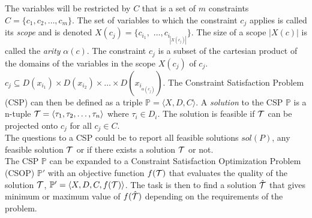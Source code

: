 The variables will be restricted by $C$ that is a set of $m$ constraints $C= \{ 
c_1,c_2, \dots , c_m \} $. The set of variables to which the constraint $c_j$   applies is 
called its \emph{scope} and 
is denoted $X(c_j) = \{c_{i_1} ,$ $ \dots , c_{i_{|X(c_j)|}}\}$. The size of a scope $|X(c)|$ is called the 
\emph{arity} $\alpha(c)$. The constraint $c_j$ is a subset of the cartesian product of the domains of the variables in 
the scope $X(c_j)$ of $c_j$. $c_j \subseteq D(x_{i_1}) \times D(x_{i_2}) \times \dots \times D(x_{i_{\alpha(c_j)}})$.
The Constraint Satisfaction Problem (CSP) can then be defined as a triple $\mathbb{P} = \langle X,D,C \rangle$. A 
\emph{solution} to the CSP $\mathbb{P}$ is a n-tuple $\mathcal{T} = \langle \tau_1,\tau_2,\dots,\tau_n\rangle $ where $\tau_i 
\in D_i$. The solution is feasible if $\mathcal{T}$ can be projected onto $c_j$ for all 
$c_j \in C$. \\ 
The questions to a CSP could be to report all feasible solutions $sol(P)$, any feasible solution $\mathcal{T}$ or if there 
exists a solution $\mathcal{T}$ or not. \\
The CSP $\mathbb{P}$ can be expanded to a Constraint Satisfaction Optimization Problem (CSOP) $\mathbb{P'}$ 
with an objective function $f(\mathcal{T})$ that evaluates the quality of the solution $\mathcal{T}$, $\mathbb{P'} = \langle 
X,D,C,f(\mathcal{T}) \rangle$. The task is then to find a 
solution $\hat{\mathcal{T}}$ that gives minimum or maximum value of $f(\hat{\mathcal{T}})$ depending on the requirements of the 
problem. \\ \\ 
